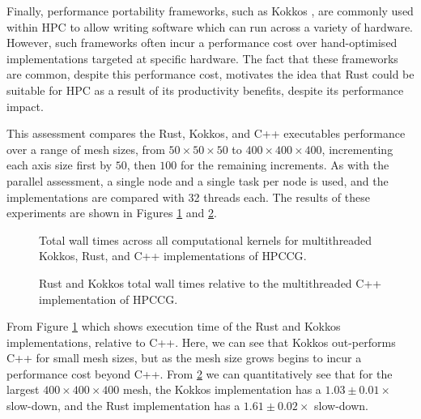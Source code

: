 Finally, performance portability frameworks, such as Kokkos \cite{KokkosEcosystem}, are commonly used within \acrshort{HPC} to allow writing software which can run across a variety of hardware. However, such frameworks often incur a performance cost over hand-optimised implementations targeted at specific hardware. The fact that these frameworks are common, despite this performance cost, motivates the idea that Rust could be suitable for \acrshort{HPC} as a result of its productivity benefits, despite its performance impact.

This assessment compares the Rust, Kokkos, and C++ executables performance over a range of mesh sizes, from $50 \times 50 \times 50$ to $400 \times 400 \times 400$, incrementing each axis size first by $50$, then $100$ for the remaining increments. As with the parallel assessment, a single node and a single task per node is used, and the implementations are compared with 32 threads each. The results of these experiments are shown in Figures \ref{fig:16_kokkos_line} and \ref{fig:17_kokkos_line_relative}.

\begin{figure}[H]
    \centering
    \fbox{}
    \captionsetup{skip=0pt}
    \caption{Total wall times across all computational kernels for multithreaded Kokkos, Rust, and C++ implementations of \acrshort{HPCCG}.}
    \label{fig:16_kokkos_line}
\end{figure}

\begin{figure}[H]
    \centering
    \fbox{}
    \captionsetup{skip=0pt}
    \caption{Rust and Kokkos total wall times relative to the multithreaded C++ implementation of \acrshort{HPCCG}.}
    \label{fig:17_kokkos_line_relative}
\end{figure}


From Figure \ref{fig:16_kokkos_line} which shows execution time of the Rust and Kokkos implementations, relative to C++. Here, we can see that Kokkos out-performs C++ for small mesh sizes, but as the mesh size grows begins to incur a performance cost beyond C++. From \ref{fig:17_kokkos_line_relative} we can quantitatively see that for the largest $400 \times 400 \times 400$ mesh, the Kokkos implementation has a $1.03 \pm 0.01 \times$ slow-down, and the Rust implementation has a $1.61 \pm 0.02 \times$ slow-down. 


